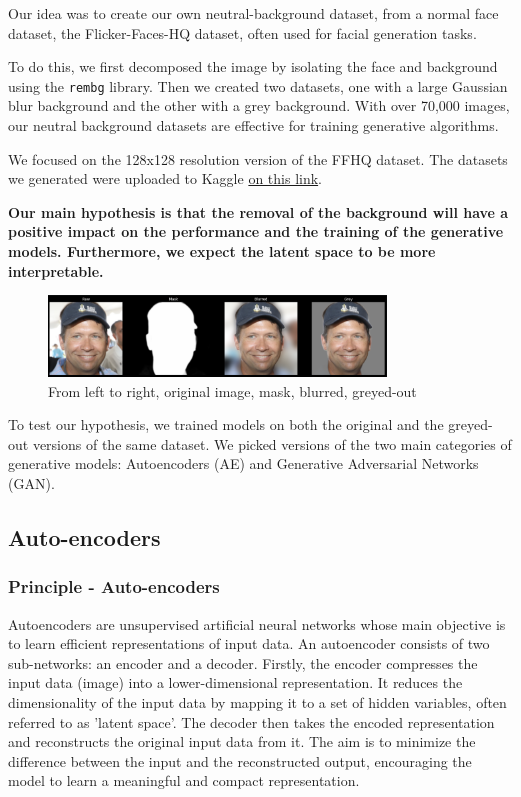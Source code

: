 \documentclass{article}
\begin{document}
\quad Our idea was to create our own neutral-background dataset, from a normal face dataset, the Flicker-Faces-HQ dataset, often used for facial generation tasks. 

To do this, we first decomposed the image by isolating the face and background using the \texttt{rembg} library. 
Then we created two datasets, one with a large Gaussian blur background and the other with a grey background. 
With over 70,000 images, our neutral background datasets are effective for training generative algorithms.

We focused on the 128x128 resolution version of the FFHQ dataset.
The datasets we generated were uploaded to Kaggle \hyperlink{https://www.kaggle.com/thomaskientz/datasets}{on this link}.

\textbf{Our main hypothesis is that the removal of the background will have a positive impact on the performance and the training of the generative models. 
Furthermore, we expect the latent space to be more interpretable.}

\begin{figure}[H]
    \centering
    \includegraphics[width=0.8\textwidth]{images/mask.png}
    \caption{From left to right, original image, mask, blurred, greyed-out}
\end{figure}

To test our hypothesis, we trained models on both the original and the greyed-out versions of the same dataset. 
We picked versions of the two main categories of generative models: Autoencoders (AE) and Generative Adversarial Networks (GAN).

\subsection{Auto-encoders}
\subsubsection*{Principle - Auto-encoders}

\quad Autoencoders are unsupervised artificial neural networks whose main objective is to learn efficient representations of input data. 
An autoencoder consists of two sub-networks: an encoder and a decoder. 
Firstly, the encoder compresses the input data (image) into a lower-dimensional representation. 
It reduces the dimensionality of the input data by mapping it to a set of hidden variables, often referred to as 'latent space'. 
The decoder then takes the encoded representation and reconstructs the original input data from it. 
The aim is to minimize the difference between the input and the reconstructed output, encouraging the model to learn a meaningful and compact representation.
\end{document}
